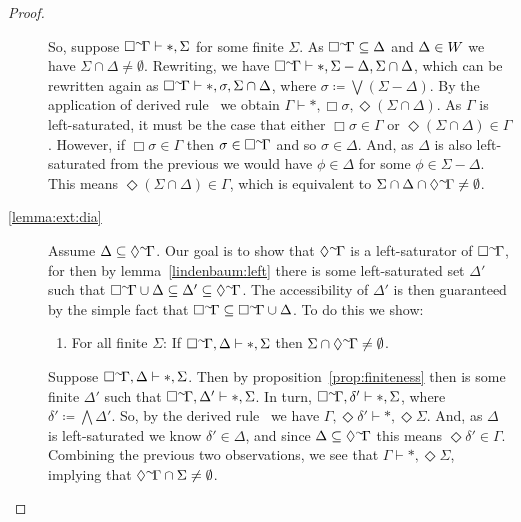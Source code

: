 \documentclass[10pt]{article}
\begin{document}
\begin{lemma}
\begin{proof}
\begin{description}
    So, suppose \({\Box}^{\sim}\hspace*{-2pt}{\Gamma} \vdash \ast,\Sigma\) for some finite \(\Sigma\).
    As \({\Box}^{\sim}\hspace*{-2pt}{\Gamma} \subseteq \Delta\) and \(\Delta \in W\) we have \(\Sigma \cap \Delta \ne \emptyset\).
    Rewriting, we have \({\Box}^{\sim}\hspace*{-2pt}{\Gamma} \vdash \ast, \Sigma - \Delta,\Sigma \cap \Delta\), which can be rewritten again as \({\Box}^{\sim}\hspace*{-2pt}{\Gamma} \vdash \ast, \sigma, \Sigma \cap \Delta\), where \(\sigma \coloneq \bigvee(\Sigma - \Delta)\).
    By the application of derived rule \ we obtain \(\Gamma \vdash \ast, \Box\sigma, \Diamond(\Sigma \cap \Delta)\).
    As \(\Gamma\) is left-saturated, it must be the case that either \(\Box\sigma \in \Gamma\) or \(\Diamond(\Sigma \cap \Delta) \in \Gamma\).
    However, if \(\Box\sigma \in \Gamma\) then \(\sigma \in {\Box}^{\sim}\hspace*{-2pt}{\Gamma}\) and so \(\sigma \in \Delta\).
    And, as \(\Delta\) is also left-saturated from the previous we would have \(\phi \in \Delta\) for some \(\phi \in \Sigma - \Delta\).
    This means \(\Diamond(\Sigma \cap \Delta) \in \Gamma\), which is equivalent to \(\Sigma \cap \Delta \cap {\Diamond}^{\sim}\hspace*{-2pt}{\Gamma} \ne \emptyset\).

  \item[\ref{lemma:ext:dia}]
    Assume \(\Delta \subseteq {\Diamond}^{\sim}\hspace*{-2pt}{\Gamma}\).
    Our goal is to show that \({\Diamond}^{\sim}\hspace*{-2pt}{\Gamma}\) is a left-saturator of \({\Box}^{\sim}\hspace*{-2pt}{\Gamma}\), for then by lemma~\ref{lindenbaum:left} there is some left-saturated set \(\Delta'\) such that \({\Box}^{\sim}\hspace*{-2pt}{\Gamma} \cup \Delta \subseteq \Delta' \subseteq {\Diamond}^{\sim}\hspace*{-2pt}{\Gamma}\).
    The accessibility of \(\Delta'\) is then guaranteed by the simple fact that \({\Box}^{\sim}\hspace*{-2pt}{\Gamma} \subseteq {\Box}^{\sim}\hspace*{-2pt}{\Gamma} \cup \Delta\).
    To do this we show:
    \begin{enumerate}[resume]
    \item For all finite \(\Sigma\): If \({\Box}^{\sim}\hspace*{-2pt}{\Gamma}, \Delta \vdash \ast, \Sigma\) then \(\Sigma \cap {\Diamond}^{\sim}\hspace*{-2pt}{\Gamma} \ne \emptyset\).
    \end{enumerate}
    Suppose \({\Box}^{\sim}\hspace*{-2pt}{\Gamma}, \Delta \vdash \ast, \Sigma\).
    Then by proposition~\ref{prop:finiteness} then is some finite \(\Delta'\) such that \({\Box}^{\sim}\hspace*{-2pt}{\Gamma}, \Delta' \vdash \ast, \Sigma\).
    In turn, \({\Box}^{\sim}\hspace*{-2pt}{\Gamma}, \delta' \vdash \ast, \Sigma\), where \(\delta' \coloneq \bigwedge\Delta'\).
    So, by the derived rule \ we have \(\Gamma, \Diamond\delta' \vdash \ast, \Diamond\Sigma\).
    And, as \(\Delta\) is left-saturated we know \(\delta' \in \Delta\), and since \(\Delta \subseteq {\Diamond}^{\sim}\hspace*{-2pt}{\Gamma}\) this means \(\Diamond\delta' \in \Gamma\).
    Combining the previous two observations, we see that \(\Gamma \vdash \ast, \Diamond\Sigma\), implying that \({\Diamond}^{\sim}\hspace*{-2pt}{\Gamma} \cap \Sigma \ne \emptyset\).
  \end{description}


\end{proof}
\end{lemma}
\end{document}
